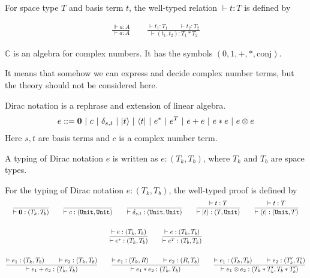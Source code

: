 \begin{definition}
  For space type $T$ and basis term $t$, the well-typed relation $\vdash t : T$ is defined by
  
  \begin{align*}
    \frac{\Vdash a : A}{\vdash a : A}
    \qquad
    \frac{\vdash t_1 : T_1 \qquad \vdash t_2 : T_2}{\vdash (t_1, t_2) : T_1 * T_2}
  \end{align*}
\end{definition}

\begin{postulate}
  $\mathbb{C}$ is an algebra for complex numbers. It has the symbols $(0, 1, +, *, \textrm{conj})$.
\end{postulate}
It means that somehow we can express and decide complex number terms, but the theory should not be considered here.

\begin{definition}
  Dirac notation is a rephrase and extension of linear algebra.
  \begin{align*}
    e ::= \mathbf{0}\ |\ c\ |\ \delta_{s, t}\ |\ \ket{t}\ |\ \bra{t}\ |\ e^*\ |\ e^T\ |\ e + e\ |\ e * e\ |\ e \otimes e
  \end{align*}
  Here $s, t$ are basis terms and $c$ is a complex number term.
\end{definition}

\begin{definition}
  A typing of Dirac notation $e$ is written as $e : (T_k, T_b)$, where $T_k$ and $T_b$ are space types.
\end{definition}

\begin{definition} 
  For the typing of Dirac notation $e : (T_k, T_b)$, the well-typed proof is defined by
  \begin{gather*}
    \frac{}{\vdash \mathbf{0} : (T_k, T_b)}
    \qquad
    \frac{}{\vdash c : (\texttt{Unit}, \texttt{Unit})}
    \qquad
    \frac{}{\vdash \delta_{s, t} : (\texttt{Unit}, \texttt{Unit})}
    \qquad
    \frac{\vdash t : T}{\vdash |t\rangle : (T, \texttt{Unit})}
    \qquad 
    \frac{\vdash t : T}{\vdash \langle t| : (\texttt{Unit}, T)}\\
    \ \\
    \frac{\vdash e : (T_k, T_b)}{\vdash e^* : (T_k, T_b)}
    \qquad
    \frac{\vdash e : (T_k, T_b)}{\vdash e^T : (T_b, T_k)}\\
    \ \\
    \frac{\vdash e_1 : (T_k, T_b)\qquad \vdash e_2 : (T_k, T_b)}{\vdash e_1 + e_2 : (T_k, T_b)}
    \qquad 
    \frac{\vdash e_1 : (T_k, R)\qquad \vdash e_2 : (R, T_b)}{\vdash e_1 * e_2 : (T_k, T_b)}
    \qquad
    \frac{\vdash e_1 : (T_k, T_b)\qquad \vdash e_2 : (T_k', T_b')}{\vdash e_1 \otimes e_2 : (T_k * T_k', T_b * T_b')}
  \end{gather*}
\end{definition}

